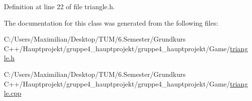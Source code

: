 Definition at line 22 of file triangle.\+h.



The documentation for this class was generated from the following files\+:\begin{DoxyCompactItemize}
\item 
C\+:/\+Users/\+Maximilian/\+Desktop/\+T\+U\+M/6.\+Semester/\+Grundkurs C++/\+Hauptprojekt/gruppe4\+\_\+hauptprojekt/gruppe4\+\_\+hauptprojekt/\+Game/\hyperlink{triangle_8h}{triangle.\+h}\item 
C\+:/\+Users/\+Maximilian/\+Desktop/\+T\+U\+M/6.\+Semester/\+Grundkurs C++/\+Hauptprojekt/gruppe4\+\_\+hauptprojekt/gruppe4\+\_\+hauptprojekt/\+Game/\hyperlink{triangle_8cpp}{triangle.\+cpp}\end{DoxyCompactItemize}
